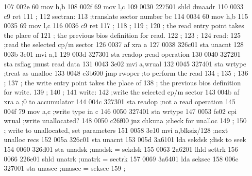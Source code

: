 107    002e 60               mov      h,b
108    002f 69               mov      l,c
109    0030 227501           shld     dmaadr
110    0033 c9               ret
111                ;
112                sectran:
113                          ;translate sector number bc
114    0034 60               mov      h,b
115    0035 69               mov      l,c
116    0036 c9               ret
117                ;
118                ;
119                ;
120                ;         the read entry point takes the place of
121                ;         the previous bios definition for read.
122                ;
123                ;
124                read:
125                          ;read the selected cp/m sector
126    0037 af               xra      a
127    0038 326c01           sta      unacnt
128    003b 3e01             mvi      a,1
129    003d 327301           sta      readop                 ;read operation
130    0040 327201           sta      rsflag                 ;must read data
131    0043 3e02             mvi      a,wrual
132    0045 327401           sta      wrtype                 ;treat as unalloc
133    0048 c3b600           jmp      rwoper                 ;to perform the read
134                ;
135                ;
136                ;
137                ;         the write entry point takes the place of
138                ;         the previous bios definition for write.
139                ;
140                ;
141                write:
142                          ;write the selected cp/m sector
143    004b af               xra      a                      ;0 to accumulator
144    004c 327301           sta      readop                 ;not a read operation
145    004f 79               mov      a,c                    ;write type in c
146    0050 327401           sta      wrtype
147    0053 fe02             cpi      wrual                  ;write unallocated?
148    0050 c26f00           jnz      chkuna                 ;check for unalloc
149                ;
150                ;         write to unallocated, set parameters
151    0058 3e10             mvi      a,blksiz/128           ;next unalloc recs
152    005a 326c01           sta      unacnt
153    005d 3a6101           lda      sekdsk                 ;disk to seek
154    0060 326d01           sta      unadsk                 ;unadsk = sekdsk
155    0063 2a6201           lhld     settrk
156    0066 226e01           shld     unatrk                 ;unatrk = sectrk
157    0069 3a6401           lda      seksec
158    006c 327001           sta      unasec                 ;unasec = seksec
159                ;
